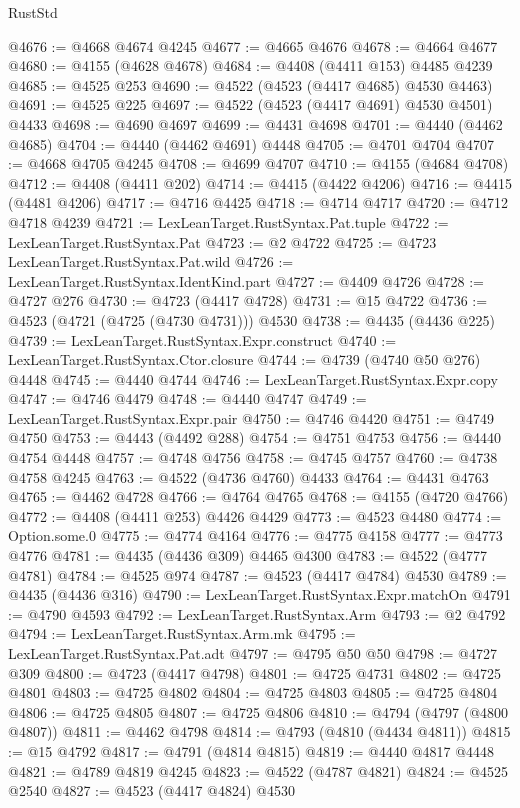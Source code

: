 \begin{lexlean}{RustStd}
\begin{coremodule}
@4676 := @4668 @4674 @4245
@4677 := @4665 @4676
@4678 := @4664 @4677
@4680 := @4155 (@4628 @4678)
@4684 := @4408 (@4411 @153) @4485 @4239
@4685 := @4525 @253
@4690 := @4522 (@4523 (@4417 @4685) @4530 @4463)
@4691 := @4525 @225
@4697 := @4522 (@4523 (@4417 @4691) @4530 @4501) @4433
@4698 := @4690 @4697
@4699 := @4431 @4698
@4701 := @4440 (@4462 @4685)
@4704 := @4440 (@4462 @4691) @4448
@4705 := @4701 @4704
@4707 := @4668 @4705 @4245
@4708 := @4699 @4707
@4710 := @4155 (@4684 @4708)
@4712 := @4408 (@4411 @202)
@4714 := @4415 (@4422 @4206)
@4716 := @4415 (@4481 @4206)
@4717 := @4716 @4425
@4718 := @4714 @4717
@4720 := @4712 @4718 @4239
@4721 := LexLeanTarget.RustSyntax.Pat.tuple
@4722 := LexLeanTarget.RustSyntax.Pat
@4723 := @2 @4722
@4725 := @4723 LexLeanTarget.RustSyntax.Pat.wild
@4726 := LexLeanTarget.RustSyntax.IdentKind.part
@4727 := @4409 @4726
@4728 := @4727 @276
@4730 := @4723 (@4417 @4728)
@4731 := @15 @4722
@4736 := @4523 (@4721 (@4725 (@4730 @4731))) @4530
@4738 := @4435 (@4436 @225)
@4739 := LexLeanTarget.RustSyntax.Expr.construct
@4740 := LexLeanTarget.RustSyntax.Ctor.closure
@4744 := @4739 (@4740 @50 @276) @4448
@4745 := @4440 @4744
@4746 := LexLeanTarget.RustSyntax.Expr.copy
@4747 := @4746 @4479
@4748 := @4440 @4747
@4749 := LexLeanTarget.RustSyntax.Expr.pair
@4750 := @4746 @4420
@4751 := @4749 @4750
@4753 := @4443 (@4492 @288)
@4754 := @4751 @4753
@4756 := @4440 @4754 @4448
@4757 := @4748 @4756
@4758 := @4745 @4757
@4760 := @4738 @4758 @4245
@4763 := @4522 (@4736 @4760) @4433
@4764 := @4431 @4763
@4765 := @4462 @4728
@4766 := @4764 @4765
@4768 := @4155 (@4720 @4766)
@4772 := @4408 (@4411 @253) @4426 @4429
@4773 := @4523 @4480
@4774 := Option.some.{0}
@4775 := @4774 @4164
@4776 := @4775 @4158
@4777 := @4773 @4776
@4781 := @4435 (@4436 @309) @4465 @4300
@4783 := @4522 (@4777 @4781)
@4784 := @4525 @974
@4787 := @4523 (@4417 @4784) @4530
@4789 := @4435 (@4436 @316)
@4790 := LexLeanTarget.RustSyntax.Expr.matchOn
@4791 := @4790 @4593
@4792 := LexLeanTarget.RustSyntax.Arm
@4793 := @2 @4792
@4794 := LexLeanTarget.RustSyntax.Arm.mk
@4795 := LexLeanTarget.RustSyntax.Pat.adt
@4797 := @4795 @50 @50
@4798 := @4727 @309
@4800 := @4723 (@4417 @4798)
@4801 := @4725 @4731
@4802 := @4725 @4801
@4803 := @4725 @4802
@4804 := @4725 @4803
@4805 := @4725 @4804
@4806 := @4725 @4805
@4807 := @4725 @4806
@4810 := @4794 (@4797 (@4800 @4807))
@4811 := @4462 @4798
@4814 := @4793 (@4810 (@4434 @4811))
@4815 := @15 @4792
@4817 := @4791 (@4814 @4815)
@4819 := @4440 @4817 @4448
@4821 := @4789 @4819 @4245
@4823 := @4522 (@4787 @4821)
@4824 := @4525 @2540
@4827 := @4523 (@4417 @4824) @4530

\end{coremodule}
\end{lexlean}
